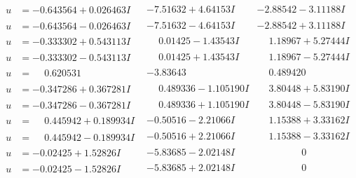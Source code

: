 \documentclass[1p]{elsarticle_modified}
\theoremstyle{definition}
\begin{document}
$$\begin{array}{c|c|c}
\begin{aligned}
u &= -0.643564 + 0.026463 I\end{aligned}
 & -7.51632 + 4.64153 I & -2.88542 - 3.11188 I \\ \hline\begin{aligned}
u &= -0.643564 - 0.026463 I\end{aligned}
 & -7.51632 - 4.64153 I & -2.88542 + 3.11188 I \\ \hline\begin{aligned}
u &= -0.333302 + 0.543113 I\end{aligned}
 & \phantom{-}0.01425 - 1.43543 I & \phantom{-}1.18967 + 5.27444 I \\ \hline\begin{aligned}
u &= -0.333302 - 0.543113 I\end{aligned}
 & \phantom{-}0.01425 + 1.43543 I & \phantom{-}1.18967 - 5.27444 I \\ \hline\begin{aligned}
u &= \phantom{-}0.620531\phantom{ +0.000000I}\end{aligned}
 & -3.83643\phantom{ +0.000000I} & \phantom{-}0.489420\phantom{ +0.000000I} \\ \hline\begin{aligned}
u &= -0.347286 + 0.367281 I\end{aligned}
 & \phantom{-}0.489336 - 1.105190 I & \phantom{-}3.80448 + 5.83190 I \\ \hline\begin{aligned}
u &= -0.347286 - 0.367281 I\end{aligned}
 & \phantom{-}0.489336 + 1.105190 I & \phantom{-}3.80448 - 5.83190 I \\ \hline\begin{aligned}
u &= \phantom{-}0.445942 + 0.189934 I\end{aligned}
 & -0.50516 - 2.21066 I & \phantom{-}1.15388 + 3.33162 I \\ \hline\begin{aligned}
u &= \phantom{-}0.445942 - 0.189934 I\end{aligned}
 & -0.50516 + 2.21066 I & \phantom{-}1.15388 - 3.33162 I \\ \hline\begin{aligned}
u &= -0.02425 + 1.52826 I\end{aligned}
 & -5.83685 - 2.02148 I & \phantom{-0.000000 } 0 \\ \hline\begin{aligned}
u &= -0.02425 - 1.52826 I\end{aligned}
 & -5.83685 + 2.02148 I & \phantom{-0.000000 } 0 \\ \hline\begin{aligned}

\end{aligned}
\end{array}$$
\end{document}
